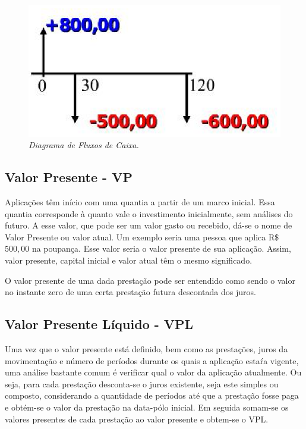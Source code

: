 \begin{figure}[!h]
 \centering
 \includegraphics[scale=0.8]{fluxo.eps}
 \caption{\it Diagrama de Fluxos de Caixa.} \label{fluxo}
\end{figure}

\subsection{Valor Presente - VP}

Aplicações têm início com uma quantia a partir de um marco inicial. Essa quantia corres\-ponde à quanto vale o investimento inicialmente, sem análises do futuro. A esse valor, que pode ser um valor gasto ou recebido, dá-se o nome de Valor Presente ou valor atual. Um exemplo seria uma pessoa que aplica R\$ $500,00$ na poupança. Esse valor seria o valor presente de sua aplicação. Assim, valor presente, capital inicial e valor atual têm o mesmo significado.

O valor presente de uma dada prestação pode ser entendido como sendo o valor no ins\-tante zero de uma certa prestação futura descontada dos juros.

\subsection{Valor Presente Líquido - VPL}

Uma vez que o valor presente está definido, bem como as prestações, juros da movimentação e número de períodos durante os quais a aplicação estaŕa vigente, uma análise bastante comum é verificar qual o valor da aplicação atualmente. Ou seja, para cada prestação desconta-se o juros existente, seja este simples ou composto, considerando a quantidade de períodos até que a prestação fosse paga e obtém-se o valor da prestação na data-pólo inicial. Em seguida somam-se os valores presentes de cada prestação ao valor presente e obtem-se o VPL.


